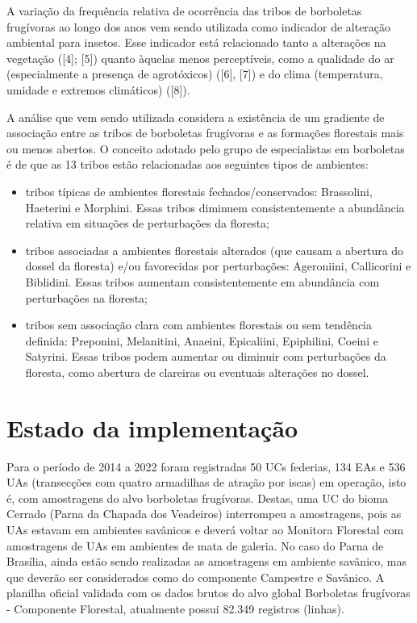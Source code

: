 \documentclass[
  letterpaper,
]{scrbook}
\begin{document}
A variação da frequência relativa de ocorrência das tribos de borboletas
frugívoras ao longo dos anos vem sendo utilizada como indicador de
alteração ambiental para insetos. Esse indicador está relacionado tanto
a alterações na vegetação ({[}4{]}; {[}5{]}) quanto àquelas menos
perceptíveis, como a qualidade do ar (especialmente a presença de
agrotóxicos) ({[}6{]}, {[}7{]}) e do clima (temperatura, umidade e
extremos climáticos) ({[}8{]}).

A análise que vem sendo utilizada considera a existência de um gradiente
de associação entre as tribos de borboletas frugívoras e as formações
florestais mais ou menos abertos. O conceito adotado pelo grupo de
especialistas em borboletas é de que as 13 tribos estão relacionadas aos
seguintes tipos de ambientes:

\begin{itemize}
\item
  tribos típicas de ambientes florestais fechados/conservados:
  Brassolini, Haeterini e Morphini. Essas tribos diminuem
  consistentemente a abundância relativa em situações de perturbações da
  floresta;
\item
  tribos associadas a ambientes florestais alterados (que causam a
  abertura do dossel da floresta) e/ou favorecidas por perturbações:
  Ageroniini, Callicorini e Biblidini. Essas tribos aumentam
  consistentemente em abundância com perturbações na floresta;
\item
  tribos sem associação clara com ambientes florestais ou sem tendência
  definida: Preponini, Melanitini, Anaeini, Epicaliini, Epiphilini,
  Coeini e Satyrini. Essas tribos podem aumentar ou diminuir com
  perturbações da floresta, como abertura de clareiras ou eventuais
  alterações no dossel.
\end{itemize}

\section{Estado da implementação}\label{estado-da-implementauxe7uxe3o-1}

Para o período de 2014 a 2022 foram registradas 50 UCs federias, 134 EAs
e 536 UAs (transecções com quatro armadilhas de atração por iscas) em
operação, isto é, com amostragens do alvo borboletas frugívoras. Destas,
uma UC do bioma Cerrado (Parna da Chapada dos Veadeiros) interrompeu a
amostragens, pois as UAs estavam em ambientes savânicos e deverá voltar
ao Monitora Florestal com amostragens de UAs em ambientes de mata de
galeria. No caso do Parna de Brasília, ainda estão sendo realizadas as
amostragens em ambiente savânico, mas que deverão ser considerados como
do componente Campestre e Savânico. A planilha oficial validada com os
dados brutos do alvo global Borboletas frugívoras - Componente
Florestal, atualmente possui 82.349 registros (linhas).
\end{document}
